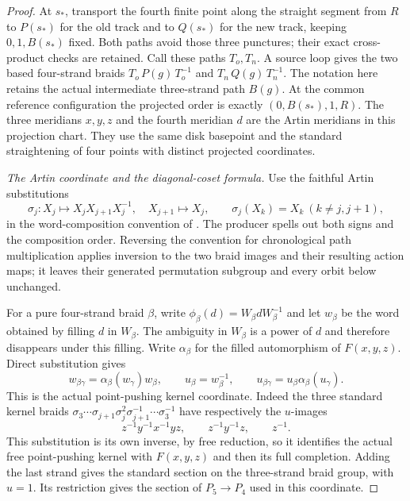 \begin{proof}
At $s_*$, transport the fourth finite point along the
straight segment from $R$ to $P(s_*)$ for the old track
and to $Q(s_*)$ for the new track, keeping $0,1,B(s_*)$
fixed. Both paths avoid those three punctures; their
exact cross-product checks are retained. Call these
paths $T_o,T_n$. A source loop gives the two based
four-strand braids
$T_o\,P(g)\,T_o^{-1}$ and $T_n\,Q(g)\,T_n^{-1}$.
The notation here retains the actual intermediate
three-strand path $B(g)$.
At the common reference configuration the projected
order is exactly $(0,B(s_*),1,R)$.
The three meridians $x,y,z$ and the fourth meridian $d$
are the Artin meridians in this projection chart.
They use the same disk basepoint and the standard
straightening of four points with distinct projected
coordinates.

\emph{The Artin coordinate and the diagonal-coset formula.}
Use the faithful Artin substitutions
\[
 \sigma_j:
 X_j\longmapsto X_jX_{j+1}X_j^{-1},\quad
 X_{j+1}\longmapsto X_j ,
 \qquad \sigma_j(X_k)=X_k\ (k\ne j,j+1),
                                                               \tag{F.20.7}
\]
in the word-composition convention of \cite{A-Artin1947}.
The producer spells out both signs and the composition
order. Reversing the convention for chronological path
multiplication applies inversion to the two braid
images and their resulting action maps; it leaves
their generated permutation subgroup and every orbit
below unchanged.

For a pure four-strand braid $\beta$, write
$\phi_\beta(d)=W_\beta dW_\beta^{-1}$ and let $w_\beta$
be the word obtained by filling $d$ in $W_\beta$.
The ambiguity in $W_\beta$ is a power of $d$ and
therefore disappears under this filling.
Write $\alpha_\beta$ for the filled automorphism of
$F(x,y,z)$. Direct substitution gives
\[
 w_{\beta\gamma}=\alpha_\beta(w_\gamma)w_\beta,\qquad
 u_\beta=w_\beta^{-1},\qquad
 u_{\beta\gamma}=u_\beta\alpha_\beta(u_\gamma).
                                                               \tag{F.20.8}
\]
This is the actual point-pushing kernel coordinate.
Indeed the three standard kernel braids
$\sigma_3\cdots\sigma_{j+1}\sigma_j^2
 \sigma_{j+1}^{-1}\cdots\sigma_3^{-1}$ have respectively
the $u$-images
\[
        z^{-1}y^{-1}x^{-1}yz,\qquad
        z^{-1}y^{-1}z,\qquad z^{-1}.
                                                               \tag{F.20.9}
\]
This substitution is its own inverse, by free reduction,
so it identifies the actual free point-pushing kernel
with $F(x,y,z)$ and then its full completion.
Adding the last strand gives the standard section on
the three-strand braid group, with $u=1$.
Its restriction gives the section of $P_5\to P_4$
used in this coordinate.


\end{proof}
